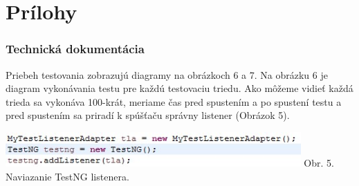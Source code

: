 \documentclass[11pt,twoside,slovak,a4paper]{article}
\begin{document}
    \newpage
 	\pagestyle{fancy}
 	\fancyhf{}
 	\fancyfoot[CE,CO]{\thepage}
 	
 	
 	
 	\newpage
 	\thispagestyle{plain}
 	\part*{Prílohy}
	\renewcommand\thesection{\Alph{section}}
	\setcounter{section}{0}
 	\section{Technická dokumentácia}
 	
 	Priebeh testovania zobrazujú diagramy na obrázkoch 6 a 7. Na obrázku 6 je diagram vykonávania testu pre každú testovaciu triedu. Ako môžeme vidieť každá trieda sa vykonáva 100-krát, meriame čas pred spustením a po spustení testu a pred spustením sa priradí k spúšťaču správny listener (Obrázok 5).
 	
 	
 	\begin{center}
 		\includegraphics[width = 320pt]{testng}
 		\newline
 		\tiny Obr. 5. Naviazanie TestNG listenera.
 	\end{center}
 	
\end{document}
